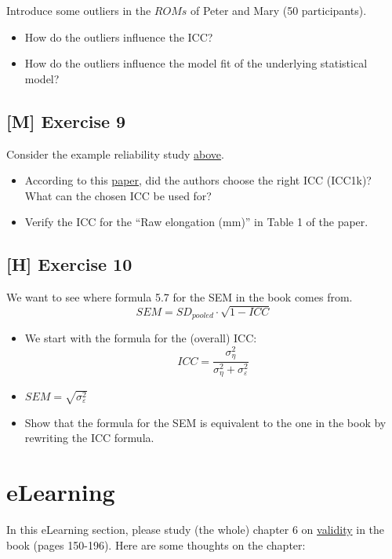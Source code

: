 \documentclass[
]{book}
\providecommand{\tightlist}{%
  \setlength{\itemsep}{0pt}\setlength{\parskip}{0pt}}
\begin{document}
Introduce some outliers in the \(ROMs\) of Peter and Mary (50 participants).

\begin{itemize}
\tightlist
\item
  How do the outliers influence the ICC?
\item
  How do the outliers influence the model fit of the underlying statistical model?
\end{itemize}

\subsection{{[}M{]} Exercise 9}\label{exercise9}

Consider the example reliability study \hyperref[example_RELStudy]{above}.

\begin{itemize}
\tightlist
\item
  According to this \href{https://www.sciencedirect.com/science/article/pii/S1556370716000158?via\%3Dihub}{paper},
  did the authors choose the right ICC (ICC1k)?
  What can the chosen ICC be used for?
\item
  Verify the ICC for the ``Raw elongation (mm)'' in Table 1 of the paper.
\end{itemize}

\subsection{{[}H{]} Exercise 10}\label{exercise10}

We want to see where formula 5.7 for the SEM in the book comes from.
\[SEM = SD_{pooled} \cdot \sqrt{1 - ICC}\]

\begin{itemize}
\item
  We start with the formula for the (overall) ICC:
  \[ICC = \frac{\sigma_{\eta}^2}{\sigma_{\eta}^2 + \sigma_{\varepsilon}^2}\]
\item
  \(SEM = \sqrt{\sigma_{\varepsilon}^2}\)
\item
  Show that the formula for the SEM is equivalent to the one in
  the book by rewriting the ICC formula.
\end{itemize}

\section{eLearning}\label{elearning}

In this eLearning section, please study (the whole) chapter 6 on
\href{https://en.wikipedia.org/wiki/Validity_(statistics)}{validity} in the book (pages 150-196).
Here are some thoughts on the chapter:
\end{document}
